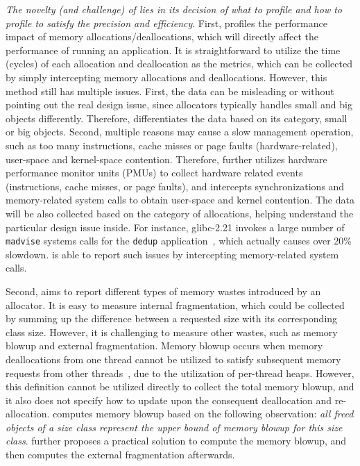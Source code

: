 \textit{The novelty (and challenge) of \MP{} lies in its decision of what to profile and how to profile to satisfy the precision and efficiency}. First, \MP{} profiles the performance impact of memory allocations/deallocations, which will directly affect the performance of running an application. It is straightforward to utilize the time (cycles) of each allocation and deallocation as the metrics, which can be collected by simply intercepting memory allocations and deallocations. However, this method still has multiple issues. First, the data can be misleading or without pointing out the real design issue, since allocators typically handles small and big objects differently. Therefore, \MP{} differentiates the data based on its category, small or big objects. Second, multiple reasons may cause a slow  management operation, such as too many instructions, cache misses or page faults (hardware-related), user-space and kernel-space contention. Therefore, \MP{} further utilizes hardware performance monitor units (PMUs) to collect hardware related events (instructions, cache misses, or page faults), and intercepts synchronizations and memory-related system calls to obtain user-space and kernel contention. The data will be also collected based on the category of allocations, helping understand the particular design issue inside. For instance, glibc-2.21 invokes a large number of \texttt{madvise} systems calls for the \texttt{dedup} application~\cite{madvise}, which actually causes over 20\% slowdown. \MP{} is able to report such issues by intercepting memory-related system calls. 

Second, \MP{} aims to report different types of memory wastes introduced by an allocator. It is easy to measure internal fragmentation, which could be collected by summing up the difference between a requested size with its corresponding class size. However, it is challenging to measure other wastes, such as memory blowup and external fragmentation. Memory blowup occurs when memory deallocations from one thread cannot be utilized to satisfy subsequent memory requests from other threads~\cite{Hoard}, due to the utilization of per-thread heaps. However, this definition cannot be utilized directly to collect the total memory blowup, and it also does not specify how to update upon the consequent deallocation and re-allocation. \MP{} computes memory blowup based on the following observation: \textit{all freed objects of a size class represent the upper bound of memory blowup for this size class}. \MP{} further proposes a practical solution to compute the memory blowup, and then computes the external fragmentation afterwards. 

